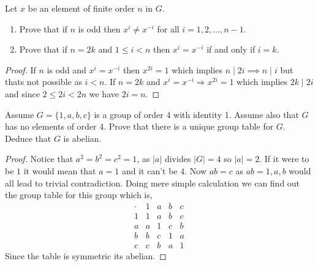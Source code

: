 \begin{problem}
    Let $x$ be an element of finite order $n$ in $G$.
    \begin{enumerate}
        \item Prove that if $n$ is odd then $x^i \neq x^{-i}$ for all $i = 1, 2, \dots, n-1$.
        \item Prove that if $n = 2k$ and $1 \le i < n$ then $x^i = x^{-i}$ if and only if $i = k$.
    \end{enumerate}
\end{problem}

\begin{proof}
    If $n$ is odd and $x^{i} = x^{-i}$ then $x^{2i}=1$ which implies $n \mid 2i \implies n \mid i$
    but thats not possible as $i < n$. If $n=2k$ and $x^{i}=x^{-i} \Rightarrow x^{2i}=1$ which implies $2k \mid 2i$ and
    since $2 \le 2i < 2n$ we have $2i=n$.
\end{proof}

\begin{problem}
    Assume $G = \{1, a, b, c\}$ is a group of order 4 with identity 1. Assume also that $G$ has no elements of order 4.
    Prove that there is a unique group table for $G$. Deduce that $G$ is abelian.
\end{problem}

\begin{proof}
    Notice that $a^2=b^2=c^2=1$, as $|a|$ divides $ |G|=4$ so $|a|=2$. If it were to be $1$ it would mean that $a=1$ and it can't be $4$.
    Now $ab=c$ as $ab=1,a,b$ would all lead to trivial contradiction. Doing mere simple calculation we can find out the group table
    for this group which is,
        \[
    \begin{array}{c|cccc}
    \cdot & 1 & a & b & c \\ \hline
    1 & 1 & a & b & c \\
    a & a & 1 & c & b \\
    b & b & c & 1 & a \\
    c & c & b & a & 1
    \end{array}
\]
Since the table is symmetric its abelian.
\end{proof}